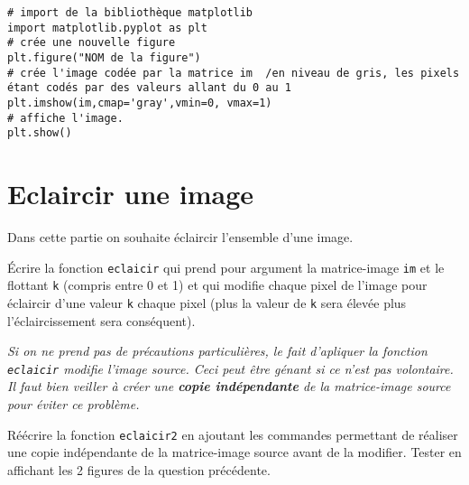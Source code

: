 \begin{lstlisting}
# import de la bibliothèque matplotlib
import matplotlib.pyplot as plt 
# crée une nouvelle figure
plt.figure("NOM de la figure")  
# crée l'image codée par la matrice im  /en niveau de gris, les pixels étant codés par des valeurs allant du 0 au 1
plt.imshow(im,cmap='gray',vmin=0, vmax=1)   
# affiche l'image.
plt.show() 	 
\end{lstlisting}


%
%


\section*{Eclaircir une image}
Dans cette partie on souhaite éclaircir l'ensemble d'une image.

\begin{question}
\'Ecrire la fonction \lstinline{eclaicir} qui prend pour argument la matrice-image \lstinline{im} et le flottant \lstinline{k} (compris entre 0 et 1) et qui modifie chaque pixel de l'image pour éclaircir d'une valeur \lstinline{k} chaque pixel (plus la valeur de \lstinline{k} sera élevée plus l'éclaircissement sera conséquent).
\end{question}


\textit{Si on ne prend pas de précautions particulières, le fait d'apliquer la fonction \lstinline{eclaicir} modifie l'image source. Ceci peut être génant si ce n'est pas volontaire. Il faut bien veiller à créer une \textbf{copie indépendante} de la matrice-image source pour éviter ce problème.}


\begin{question}
Réécrire la fonction \lstinline{eclaicir2} en ajoutant les commandes permettant de réaliser une copie indépendante de la matrice-image source avant de la modifier. Tester en affichant les 2 figures de la question précédente.
\end{question}


